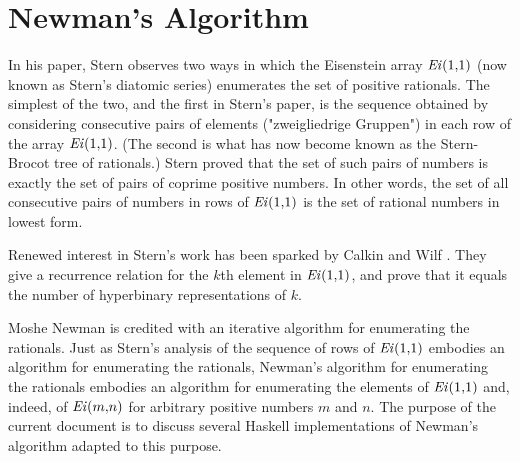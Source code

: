 \documentclass[leqno,fleqn,12pt]{article}
\begin{document}
\section{Newman's Algorithm} 
In his paper, Stern observes two ways in which the Eisenstein array 
$\mathit{Ei\/}(1{,}1)$ (now known as Stern's diatomic series)
 enumerates the set of positive rationals.  The simplest of the two,
and the first in Stern's paper, is the sequence obtained by
considering consecutive pairs of elements ("zweigliedrige Gruppen") in
each row of the array $\mathit{Ei\/}(1{,}1)$.  (The second is what has
now become known as the Stern-Brocot tree of rationals.)  Stern proved
that the set of such pairs of numbers is exactly the set of pairs
of coprime positive numbers.  In other words, the set of all
consecutive pairs of numbers in rows of $\mathit{Ei\/}(1{,}1)$ is the
set of rational numbers in lowest form.  

Renewed interest in Stern's work has been sparked by Calkin and Wilf
\cite{Calkin-Wilf2000}. They give a recurrence relation for the $k$th
element in $\mathit{Ei\/}(1{,}1)$, and prove that it equals the number of
hyperbinary representations of $k$.  

Moshe Newman is credited with an iterative algorithm for enumerating
the rationals.  Just as Stern's analysis of the sequence of rows of
$\mathit{Ei\/}(1{,}1)$ embodies an algorithm for enumerating the
rationals, Newman's algorithm for enumerating the rationals embodies
an algorithm for enumerating the elements of $\mathit{Ei\/}(1{,}1)$
and, indeed, of $\mathit{Ei\/}(m{,}n)$ for arbitrary positive numbers
$m$ and $n$.  The purpose of the current document is to discuss
several Haskell  implementations of Newman's algorithm adapted to this
purpose.  
\end{document}
